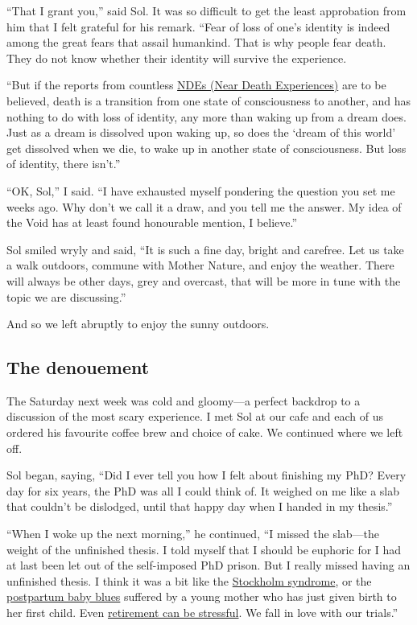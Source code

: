 \documentclass[
  a4paper,
]{article}
\begin{document}
``That I grant you,'' said Sol. It was so difficult to get the least
approbation from him that I felt grateful for his remark. ``Fear of loss
of one's identity is indeed among the great fears that assail humankind.
That is why people fear death. They do not know whether their identity
will survive the experience.

``But if the reports from countless
\href{https://en.wikipedia.org/wiki/Near-death_experience}{NDEs (Near
Death Experiences)} are to be believed, death is a transition from one
state of consciousness to another, and has nothing to do with loss of
identity, any more than waking up from a dream does. Just as a dream is
dissolved upon waking up, so does the `dream of this world' get
dissolved when we die, to wake up in another state of consciousness. But
loss of identity, there isn't.''

``OK, Sol,'' I said. ``I have exhausted myself pondering the question
you set me weeks ago. Why don't we call it a draw, and you tell me the
answer. My idea of the Void has at least found honourable mention, I
believe.''

Sol smiled wryly and said, ``It is such a fine day, bright and carefree.
Let us take a walk outdoors, commune with Mother Nature, and enjoy the
weather. There will always be other days, grey and overcast, that will
be more in tune with the topic we are discussing.''

And so we left abruptly to enjoy the sunny outdoors.

\subsection{The denouement}\label{the-denouement}

The Saturday next week was cold and gloomy---a perfect backdrop to a
discussion of the most scary experience. I met Sol at our cafe and each
of us ordered his favourite coffee brew and choice of cake. We continued
where we left off.

Sol began, saying, ``Did I ever tell you how I felt about finishing my
PhD? Every day for six years, the PhD was all I could think of. It
weighed on me like a slab that couldn't be dislodged, until that happy
day when I handed in my thesis.''

``When I woke up the next morning,'' he continued, ``I missed the
slab---the weight of the unfinished thesis. I told myself that I should
be euphoric for I had at last been let out of the self-imposed PhD
prison. But I really missed having an unfinished thesis. I think it was
a bit like the
\href{https://en.wikipedia.org/wiki/Stockholm_syndrome}{Stockholm
syndrome}, or the
\href{https://www.mayoclinic.org/diseases-conditions/postpartum-depression/symptoms-causes/syc-20376617}{postpartum
baby blues} suffered by a young mother who has just given birth to her
first child. Even
\href{https://www.health.harvard.edu/mens-health/retirement-stress-taking-it-too-easy-can-be-bad-for-you}{retirement
can be stressful}. We fall in love with our trials.''
\end{document}
